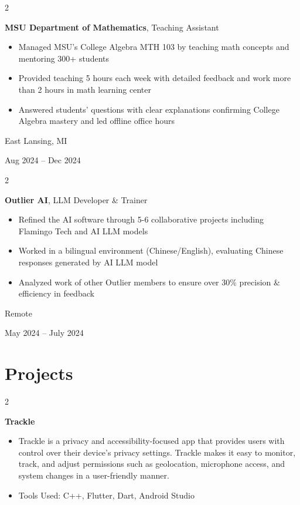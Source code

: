 \documentclass[10pt, letterpaper]{article}
\newenvironment{highlights}{
    \begin{itemize}[
        topsep=0.10 cm,
        parsep=0.10 cm,
        partopsep=0pt,
        itemsep=0pt,
        leftmargin=0.4 cm + 10pt
    ]
}{
    \end{itemize}
} %
\newenvironment{twocolentry}[2][]{
    \onecolentry
    \def\secondColumn{#2}
    \setcolumnwidth{\fill, 4.5 cm}
    \begin{paracol}{2}
}{
    \switchcolumn \raggedleft \secondColumn
    \end{paracol}
    \endonecolentry
} %
\let\hrefWithoutArrow\href
\renewcommand{\href}[2]{\hrefWithoutArrow{#1}{\ifthenelse{\equal{#2}{}}{ }{#2 }\raisebox{.15ex}{\footnotesize \faExternalLink*}}}
\begin{document}
        \vspace{0.2 cm}

        \begin{twocolentry}{
            East Lansing, MI

        Aug 2024 – Dec 2024
        }
            \textbf{MSU Department of Mathematics}, Teaching Assistant
            \begin{highlights}
                \item Managed MSU’s College Algebra MTH 103 by teaching math concepts and mentoring 300+ students
                \item Provided teaching 5 hours each week with detailed feedback and work more than 2 hours in math learning center
                \item Answered students' questions with clear explanations confirming College Algebra mastery and led offline office hours
            \end{highlights}
        \end{twocolentry}


        \vspace{0.2 cm}

        \begin{twocolentry}{
            Remote

        May 2024 – July 2024
        }
            \textbf{Outlier AI}, LLM Developer \& Trainer
            \begin{highlights}
                \item Refined the AI software through 5-6 collaborative projects including Flamingo Tech and AI LLM models
                \item Worked in a bilingual environment (Chinese/English), evaluating Chinese responses generated by AI LLM model
                \item Analyzed work of other Outlier members to ensure over 30\% precision \& efficiency in feedback
            \end{highlights}
        \end{twocolentry}



    
    \section{Projects}



        
        \begin{twocolentry}{
            \href{https://github.com/programmeruser517/Trackle}{github repo}
        }
            \textbf{Trackle}
            \begin{highlights}
                \item Trackle is a privacy and accessibility-focused app that provides users with control over their device’s privacy settings. Trackle makes it easy to monitor, track, and adjust permissions such as geolocation, microphone access, and system changes in a user-friendly manner.
                \item Tools Used: C++, Flutter, Dart, Android Studio
            \end{highlights}
        \end{twocolentry}
\end{document}
